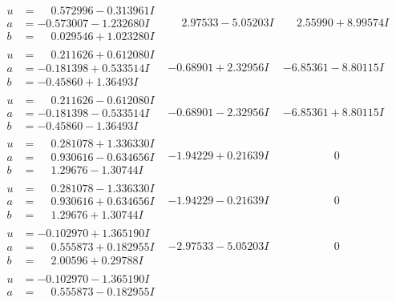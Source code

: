 \documentclass[1p]{elsarticle_modified}
\theoremstyle{definition}
\begin{document}
$$\begin{array}{c|c|c}
 \hline 
\begin{aligned}
u &= \phantom{-}0.572996 - 0.313961 I \\
a &= -0.573007 - 1.232680 I \\
b &= \phantom{-}0.029546 + 1.023280 I\end{aligned}
 & \phantom{-}2.97533 - 5.05203 I & \phantom{-}2.55990 + 8.99574 I \\ \hline\begin{aligned}
u &= \phantom{-}0.211626 + 0.612080 I \\
a &= -0.181398 + 0.533514 I \\
b &= -0.45860 + 1.36493 I\end{aligned}
 & -0.68901 + 2.32956 I & -6.85361 - 8.80115 I \\ \hline\begin{aligned}
u &= \phantom{-}0.211626 - 0.612080 I \\
a &= -0.181398 - 0.533514 I \\
b &= -0.45860 - 1.36493 I\end{aligned}
 & -0.68901 - 2.32956 I & -6.85361 + 8.80115 I \\ \hline\begin{aligned}
u &= \phantom{-}0.281078 + 1.336330 I \\
a &= \phantom{-}0.930616 - 0.634656 I \\
b &= \phantom{-}1.29676 - 1.30744 I\end{aligned}
 & -1.94229 + 0.21639 I & \phantom{-0.000000 } 0 \\ \hline\begin{aligned}
u &= \phantom{-}0.281078 - 1.336330 I \\
a &= \phantom{-}0.930616 + 0.634656 I \\
b &= \phantom{-}1.29676 + 1.30744 I\end{aligned}
 & -1.94229 - 0.21639 I & \phantom{-0.000000 } 0 \\ \hline\begin{aligned}
u &= -0.102970 + 1.365190 I \\
a &= \phantom{-}0.555873 + 0.182955 I \\
b &= \phantom{-}2.00596 + 0.29788 I\end{aligned}
 & -2.97533 - 5.05203 I & \phantom{-0.000000 } 0 \\ \hline\begin{aligned}
u &= -0.102970 - 1.365190 I \\
a &= \phantom{-}0.555873 - 0.182955 I \\

\end{aligned}
\end{array}$$
\end{document}

